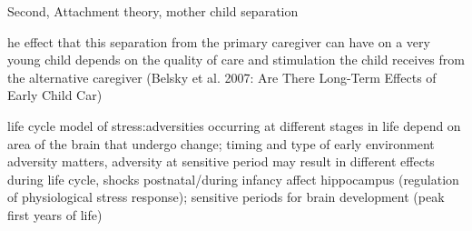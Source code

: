 \documentclass[11pt, a4paper,draft]{article} %
\begin{document}
Second, Attachment theory, mother child separation

he effect that this separation from the primary caregiver can have on a very young child depends on the quality
of care and stimulation the child receives from the alternative caregiver
(Belsky et al. 2007: Are There Long-Term Effects of Early Child Car)


\cite{raikkonen2012early} life cycle model of stress:adversities occurring at different stages in life depend on area of the brain that undergo change; timing and type of early environment adversity matters, adversity at sensitive period may result in different effects during life cycle, shocks postnatal/during infancy affect hippocampus (regulation of physiological stress response); sensitive periods for brain development (peak first years of life)

\end{document}
